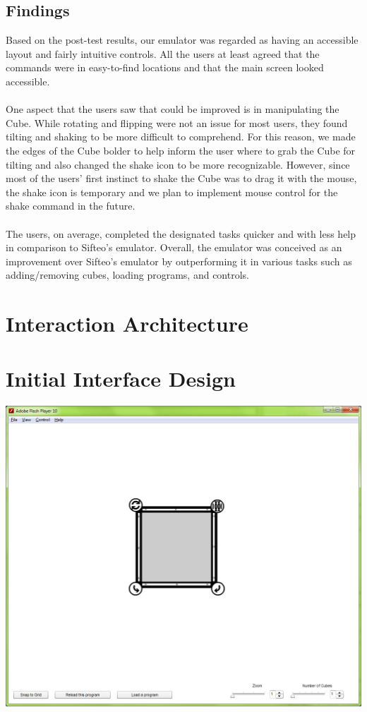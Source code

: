 \documentclass[12pt]{article}
\begin{document}
\subsection{Findings}
Based on the post-test results, our emulator was regarded as having an accessible layout and fairly intuitive controls.  All the users at least agreed that the commands were in easy-to-find locations and that the main screen looked accessible. \\\\
One aspect that the users saw that could be improved is in manipulating the Cube.  While rotating and flipping were not an issue for most users, they found tilting and shaking to be more difficult to comprehend.  For this reason, we made the edges of the Cube bolder to help inform the user where to grab the Cube for tilting and also changed the shake icon to be more recognizable.  However, since most of the users’ first instinct to shake the Cube was to drag it with the mouse, the shake icon is temporary and we plan to implement mouse control for the shake command in the future. \\\\
The users, on average, completed the designated tasks quicker and with less help in comparison to Sifteo’s emulator.  Overall, the emulator was conceived as an improvement over Sifteo’s emulator by outperforming it in various tasks such as adding/removing cubes, loading programs, and controls.

\section{Interaction Architecture}

\section{Initial Interface Design}
\begin{center}
  \includegraphics[scale=.4]{../prototype/prototype1.png}
\end{center}
\end{document}
